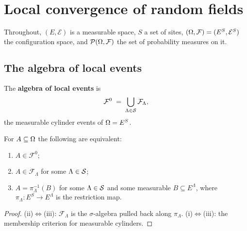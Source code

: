 \section{Local convergence of random fields}

Throughout, $(E, \mathcal{E})$ is a measurable space, $S$ a set of sites,
$(\Omega, \mathcal{F}) = (E^S, \mathcal{E}^S)$ the configuration space, and
$\mathcal{P}(\Omega, \mathcal{F})$ the set of probability measures on it.

\subsection*{The algebra of local events}

\begin{definition}
    \label{def:lc-local-events}
    \leanok

    The \textbf{algebra of local events} is
    \[
        \mathcal{F}^0 \;=\; \bigcup_{\Lambda \in \mathcal{S}} \mathcal{F}_\Lambda,
    \]
    the measurable cylinder events of $\Omega = E^S$.
\end{definition}

\begin{lemma}
    \label{lem:lc-mem-local-events}
    \leanok

    For $A \subseteq \Omega$ the following are equivalent:
    \begin{enumerate}
        \item $A \in \mathcal{F}^0$;
        \item $A \in \mathcal{F}_\Lambda$ for some $\Lambda \in \mathcal{S}$;
        \item $A = \pi_\Lambda^{-1}(B)$ for some $\Lambda \in \mathcal{S}$ and some measurable
        $B \subseteq E^\Lambda$, where $\pi_\Lambda : E^S \to E^\Lambda$ is the restriction map.
    \end{enumerate}
\end{lemma}
\begin{proof}
    \leanok

    (ii)$\Leftrightarrow$(iii): $\mathcal{F}_\Lambda$ is the $\sigma$-algebra pulled back along
    $\pi_\Lambda$. (i)$\Leftrightarrow$(iii): the membership criterion for measurable cylinders.
\end{proof}

